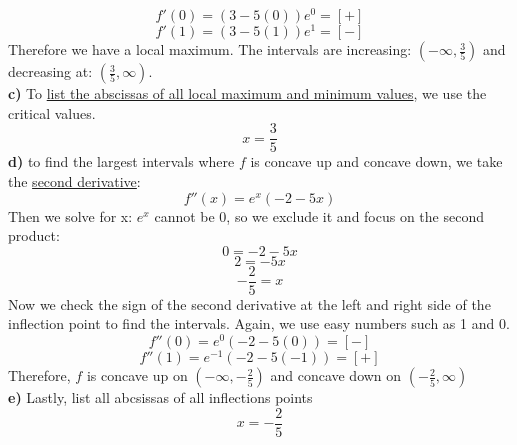 \documentclass[12pt, letterpaper]{article}
\begin{document}
\[f'(0)=(3-5(0))e^{0} = [+]\]
\[f'(1)=(3-5(1))e^{1} = [-]\]
Therefore we have a local maximum. The intervals are increasing: \((-\infty,\frac{3}{5})\) and decreasing at: \((\frac{3}{5},\infty)\).\\
\newline
\textbf{c)} To \underline{list the abscissas of all local maximum and minimum values}, we use the critical values.
\[x = \frac{3}{5}\]
\textbf{d)} to find the largest intervals where \(f\) is concave up and concave down, we take the \underline{second derivative}:
\[f''(x)=e^x(-2-5x)\]
Then we solve for x: \(e^x\) cannot be 0, so we exclude it and focus on the second product:
\[0=-2-5x\]
\[2=-5x\]
\[-\frac{2}{5}=x\]
Now we check the sign of the second derivative at the left and right side of the inflection point to find the intervals. Again, we use easy numbers such as 1 and 0.
\[f''(0)=e^{0}(-2-5(0))=[-]\]
\[f''(1)=e^{-1}(-2-5(-1))=[+]\]
Therefore, \(f\) is concave up on \((-\infty,-\frac{2}{5})\) and concave down on \((-\frac{2}{5},\infty)\)\\
\newline
\textbf{e)} Lastly, list all abcsissas of all inflections points
\[x=-\frac{2}{5}\]
\end{document}

